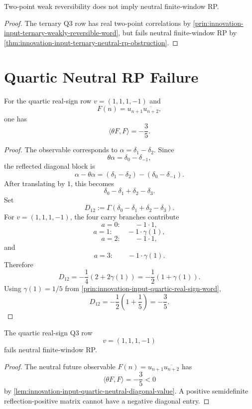 \begin{corollary}
\label{cor:innovation-input-two-point-real-not-neutral-rp}
Two-point weak reversibility does not imply neutral finite-window RP.
\end{corollary}

\begin{proof}
The ternary Q3 row has real two-point correlations by
\autoref{prin:innovation-input-ternary-weakly-reversible-word}, but fails
neutral finite-window RP by
\autoref{thm:innovation-input-ternary-neutral-rp-obstruction}.
\end{proof}

\section{Quartic Neutral RP Failure}
\label{sec:innovation-input-quartic-neutral-rp-failure}

\begin{lemma}
\label{lem:innovation-input-quartic-neutral-diagonal-value}
For the quartic real-sign row $v=(1,1,1,-1)$ and
$$
F(n)=u_{n+1}\overline{u_{n+2}},
$$
one has
$$
\langle\theta F,F\rangle=-\frac35.
$$
\end{lemma}

\begin{proof}
The observable corresponds to $\alpha=\delta_1-\delta_2$. Since
$$
\theta\alpha=\delta_0-\delta_{-1},
$$
the reflected diagonal block is
$$
\alpha-\theta\alpha
=
(\delta_1-\delta_2)-(\delta_0-\delta_{-1}).
$$
After translating by $1$, this becomes
$$
\delta_0-\delta_1+\delta_2-\delta_3.
$$
Set
$$
D_{12}:=\Gamma(\delta_0-\delta_1+\delta_2-\delta_3).
$$
For $v=(1,1,1,-1)$, the four carry branches contribute
$$
a=0:\qquad -1\cdot1,
$$
$$
a=1:\qquad -1\cdot\gamma(1),
$$
$$
a=2:\qquad -1\cdot1,
$$
and
$$
a=3:\qquad -1\cdot\gamma(1).
$$
Therefore
$$
D_{12}
=
-\frac14\left(2+2\gamma(1)\right)
=
-\frac12(1+\gamma(1)).
$$
Using $\gamma(1)=1/5$ from
\autoref{prin:innovation-input-quartic-real-sign-word},
$$
D_{12}
=
-\frac12\left(1+\frac15\right)
=
-\frac35.
$$
\end{proof}

\begin{theorem}
\label{thm:innovation-input-quartic-neutral-rp-obstruction}
The quartic real-sign Q3 row
$$
v=(1,1,1,-1)
$$
fails neutral finite-window RP.
\end{theorem}

\begin{proof}
The neutral future observable $F(n)=u_{n+1}\overline{u_{n+2}}$ has
$$
\langle\theta F,F\rangle=-\frac35<0
$$
by \autoref{lem:innovation-input-quartic-neutral-diagonal-value}. A
positive semidefinite reflection-positive matrix cannot have a negative
diagonal entry.
\end{proof}

